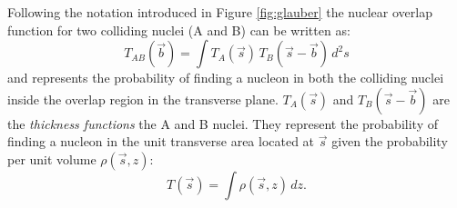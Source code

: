 Following the notation introduced in Figure \ref{fig:glauber} the nuclear overlap function for two colliding
nuclei (A and B) can be written as:
\begin{equation} \label{eq:overlap}
    T_{AB}(\vec{b}) = \int T_{A}(\vec{s})\,T_{B}(\vec{s}-\vec{b}) \,d^{2}s
\end{equation}
and represents the probability of finding a nucleon in both the colliding nuclei inside the 
overlap region in the transverse plane.
$T_{A}(\vec{s})$ and $T_{B}(\vec{s}-\vec{b})$ are the \textit{thickness functions} the A and B
nuclei.
They represent the probability of finding a nucleon in the unit transverse area located at 
$\vec{s}\xspace$ given the probability per unit volume $\rho(\vec{s},z)$:
\begin{equation} \label{eq:thickfunc}
    T(\vec{s}) = \int \rho(\vec{s},z) \,dz.
\end{equation}




